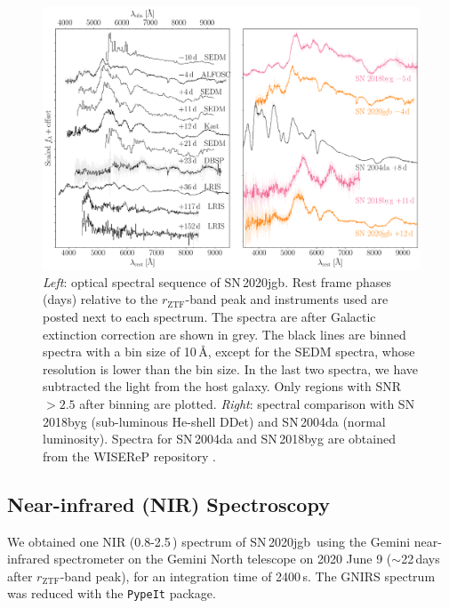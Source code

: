 \documentclass[twocolumn]{aastex631}
\newcommand{\sn}{SN\,2020jgb}
\begin{document}

\begin{figure}
    \centering
    \includegraphics[width=\textwidth]{optical_spec_evolution.pdf}
    \caption{\textit{Left}: optical spectral sequence of \sn. Rest frame phases (days) relative to the $r_\mathrm{ZTF}$-band peak and instruments used are posted next to each spectrum. The spectra are after Galactic extinction correction are shown in grey. The black lines are binned spectra with a bin size of 10\,\r{A}, except for the SEDM spectra, whose resolution is lower than the bin size. In the last two spectra, we have subtracted the light from the host galaxy. Only regions with SNR $>2.5$ after binning are plotted. 
    \textit{Right}: spectral comparison with SN\,2018byg (sub-luminous He-shell DDet) and SN\,2004da (normal luminosity). Spectra for SN\,2004da and SN\,2018byg are obtained from the WISEReP repository \citep{wiserep_2012}.} %
    \label{fig:spec_evo}
\end{figure}

\subsection{Near-infrared (NIR) Spectroscopy}
We obtained one NIR (0.8-2.5\,\micron) spectrum of \sn\ using the Gemini near-infrared spectrometer \citep[GNIRS;][]{GNIRS1998} on the Gemini North telescope on 2020 June 9 ($\sim$22\,days after $r_\mathrm{ZTF}$-band peak), for an integration time of 2400\,s. The GNIRS spectrum was reduced with the \texttt{PypeIt} package.
\end{document}
